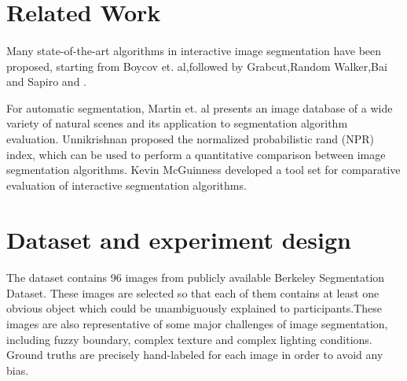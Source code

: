 \documentclass[runningheads,a4paper]{llncs}
\begin{document}
\section{Related Work}

\paragraph{}Many state-of-the-art algorithms in interactive image segmentation have been proposed, starting from Boycov et. al\citep{boykov2001interactive},followed by Grabcut\citep{rother2004grabcut},Random Walker\citep{grady2006random},Bai and Sapiro \citep{bai2007geodesic} and \citep{gulshan2010geodesic}. 

For automatic segmentation, Martin et. al  \citep{martin2001database} presents an image database of a wide variety of natural scenes and its application to segmentation algorithm evaluation.  Unnikrishnan \citep{unnikrishnan2007toward} proposed the normalized probabilistic rand (NPR) index, which can be used to perform a quantitative comparison between image segmentation algorithms. Kevin McGuinness \citep{mcguinness2010comparative} developed a tool set for comparative evaluation of interactive segmentation algorithms.

\section{Dataset and experiment design}
\paragraph{}The dataset contains 96 images from publicly available Berkeley Segmentation Dataset\citep{martin2001database}. These images are selected so that each of them contains at least one obvious object which could be unambiguously explained to participants.These images are also representative of some major challenges of image segmentation, including fuzzy boundary, complex texture and complex lighting conditions. Ground truths are precisely hand-labeled for each image in order to avoid any bias.
\end{document}
